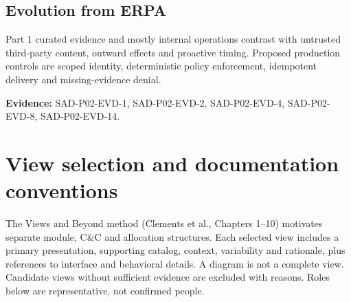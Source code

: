 \documentclass[10pt,letterpaper]{article}
\begin{document}
\subsection{Evolution from ERPA}
Part 1 curated evidence and mostly internal operations contrast with untrusted third-party content, outward effects and proactive timing. Proposed production controls are scoped identity, deterministic policy enforcement, idempotent delivery and missing-evidence denial.\par\textbf{Evidence:} SAD-P02-EVD-1, SAD-P02-EVD-2, SAD-P02-EVD-4, SAD-P02-EVD-8, SAD-P02-EVD-14.\par

\section{View selection and documentation conventions}
The Views and Beyond method (Clements et al., Chapters 1--10) motivates separate module, C\&C and allocation structures. Each selected view includes a primary presentation, supporting catalog, context, variability and rationale, plus references to interface and behavioral details. A diagram is not a complete view. Candidate views without sufficient evidence are excluded with reasons. Roles below are representative, not confirmed people.
\end{document}
